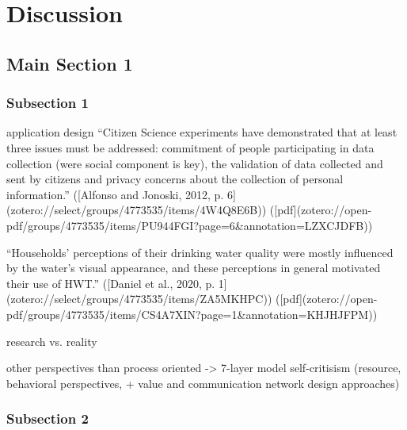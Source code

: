 
\chapter{Discussion} %

\label{Chapter5} %


\section{Main Section 1}

\subsection{Subsection 1}
application design 
“Citizen Science experiments have demonstrated that at least three issues must be addressed: commitment of people participating in data collection (were social component is key), the validation of data collected and sent by citizens and privacy concerns about the collection of personal information.” ([Alfonso and Jonoski, 2012, p. 6](zotero://select/groups/4773535/items/4W4Q8E6B)) ([pdf](zotero://open-pdf/groups/4773535/items/PU944FGI?page=6\&annotation=LZXCJDFB))

“Households’ perceptions of their drinking water quality were mostly influenced by the water’s visual appearance, and these perceptions in general motivated their use of HWT.” ([Daniel et al., 2020, p. 1](zotero://select/groups/4773535/items/ZA5MKHPC)) ([pdf](zotero://open-pdf/groups/4773535/items/CS4A7XIN?page=1&annotation=KHJHJFPM))


research vs. reality

other perspectives than process oriented -> 7-layer model self-critisism (resource, behavioral perspectives, + value and communication network design approaches)

\subsection{Subsection 2}

